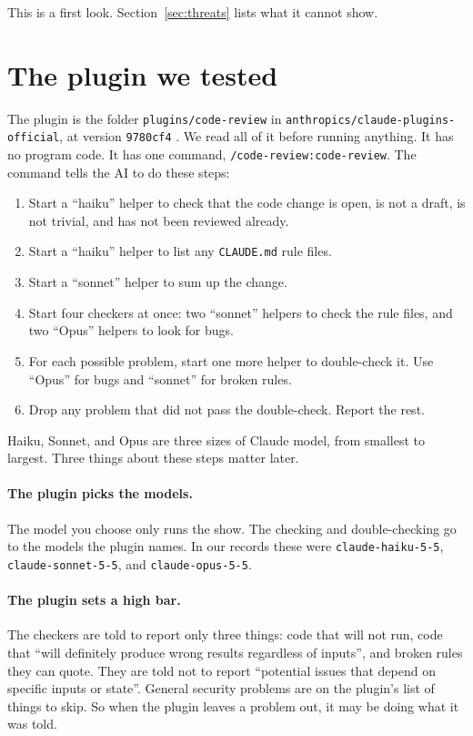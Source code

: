\documentclass[11pt]{article}
\begin{document}
This is a first look. Section~\ref{sec:threats} lists what it cannot show.

\section{The plugin we tested}
\label{sec:plugin}

The plugin is the folder \texttt{plugins/code-review} in \texttt{anthropics/claude-plugins-official}, at version \texttt{9780cf4} \citep{anthropic2026plugin}. We read all of it before running anything. It has no program code. It has one command, \texttt{/code-review:code-review}. The command tells the AI to do these steps:

\begin{enumerate}
\item Start a ``haiku'' helper to check that the code change is open, is not a draft, is not trivial, and has not been reviewed already.
\item Start a ``haiku'' helper to list any \texttt{CLAUDE.md} rule files.
\item Start a ``sonnet'' helper to sum up the change.
\item Start four checkers at once: two ``sonnet'' helpers to check the rule files, and two ``Opus'' helpers to look for bugs.
\item For each possible problem, start one more helper to double-check it. Use ``Opus'' for bugs and ``sonnet'' for broken rules.
\item Drop any problem that did not pass the double-check. Report the rest.
\end{enumerate}

Haiku, Sonnet, and Opus are three sizes of Claude model, from smallest to largest. Three things about these steps matter later.

\paragraph{The plugin picks the models.} The model you choose only runs the show. The checking and double-checking go to the models the plugin names. In our records these were \texttt{claude-haiku-5-5}, \texttt{claude-sonnet-5-5}, and \texttt{claude-opus-5-5}.

\paragraph{The plugin sets a high bar.} The checkers are told to report only three things: code that will not run, code that ``will definitely produce wrong results regardless of inputs'', and broken rules they can quote. They are told not to report ``potential issues that depend on specific inputs or state''. General security problems are on the plugin's list of things to skip. So when the plugin leaves a problem out, it may be doing what it was told.
\end{document}
